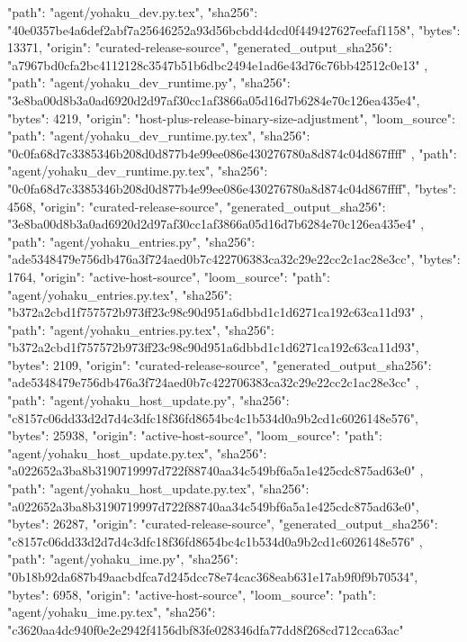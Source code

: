 {    {
      "path": "agent/yohaku_dev.py.tex",
      "sha256": "40e0357be4a6def2abf7a25646252a93d56bcbdd4dcd0f449427627eefaf1158",
      "bytes": 13371,
      "origin": "curated-release-source",
      "generated_output_sha256": "a7967bd0cfa2bc4112128c3547b51b6dbc2494e1ad6e43d76c76bb42512c0e13"
    },
    {
      "path": "agent/yohaku_dev_runtime.py",
      "sha256": "3e8ba00d8b3a0ad6920d2d97af30cc1af3866a05d16d7b6284e70c126ea435e4",
      "bytes": 4219,
      "origin": "host-plus-release-binary-size-adjustment",
      "loom_source": {
        "path": "agent/yohaku_dev_runtime.py.tex",
        "sha256": "0c0fa68d7c3385346b208d0d877b4e99ee086e430276780a8d874c04d867ffff"
      }
    },
    {
      "path": "agent/yohaku_dev_runtime.py.tex",
      "sha256": "0c0fa68d7c3385346b208d0d877b4e99ee086e430276780a8d874c04d867ffff",
      "bytes": 4568,
      "origin": "curated-release-source",
      "generated_output_sha256": "3e8ba00d8b3a0ad6920d2d97af30cc1af3866a05d16d7b6284e70c126ea435e4"
    },
    {
      "path": "agent/yohaku_entries.py",
      "sha256": "ade5348479e756db476a3f724aed0b7c422706383ca32c29e22cc2c1ac28e3cc",
      "bytes": 1764,
      "origin": "active-host-source",
      "loom_source": {
        "path": "agent/yohaku_entries.py.tex",
        "sha256": "b372a2cbd1f757572b973ff23c98c90d951a6dbbd1c1d6271ca192c63ca11d93"
      }
    },
    {
      "path": "agent/yohaku_entries.py.tex",
      "sha256": "b372a2cbd1f757572b973ff23c98c90d951a6dbbd1c1d6271ca192c63ca11d93",
      "bytes": 2109,
      "origin": "curated-release-source",
      "generated_output_sha256": "ade5348479e756db476a3f724aed0b7c422706383ca32c29e22cc2c1ac28e3cc"
    },
    {
      "path": "agent/yohaku_host_update.py",
      "sha256": "c8157c06dd33d2d7d4c3dfc18f36fd8654bc4c1b534d0a9b2cd1c6026148e576",
      "bytes": 25938,
      "origin": "active-host-source",
      "loom_source": {
        "path": "agent/yohaku_host_update.py.tex",
        "sha256": "a022652a3ba8b3190719997d722f88740aa34c549bf6a5a1e425cdc875ad63e0"
      }
    },
    {
      "path": "agent/yohaku_host_update.py.tex",
      "sha256": "a022652a3ba8b3190719997d722f88740aa34c549bf6a5a1e425cdc875ad63e0",
      "bytes": 26287,
      "origin": "curated-release-source",
      "generated_output_sha256": "c8157c06dd33d2d7d4c3dfc18f36fd8654bc4c1b534d0a9b2cd1c6026148e576"
    },
    {
      "path": "agent/yohaku_ime.py",
      "sha256": "0b18b92da687b49aacbdfca7d245dcc78e74cac368eab631e17ab9f0f9b70534",
      "bytes": 6958,
      "origin": "active-host-source",
      "loom_source": {
        "path": "agent/yohaku_ime.py.tex",
        "sha256": "c3620aa4dc940f0e2e2942f4156dbf83fe028346dfa77dd8f268cd712cca63ac"
}}}
